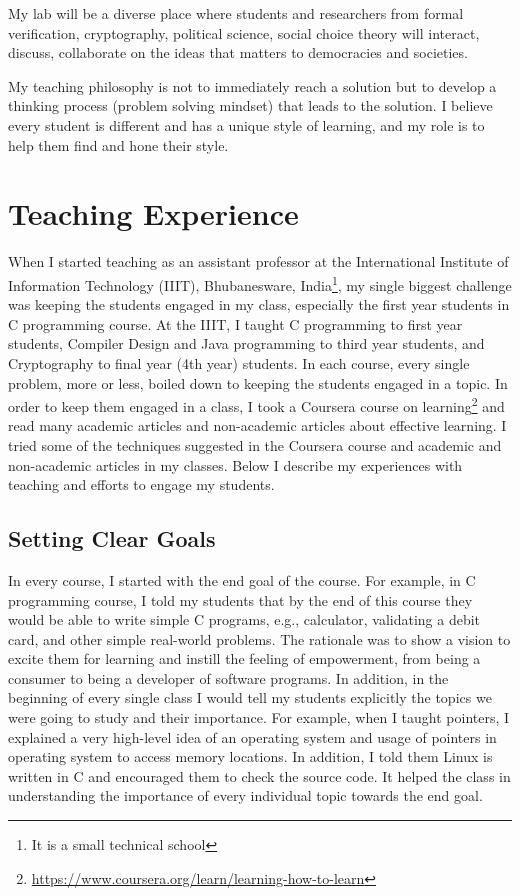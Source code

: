 \documentclass[a4paper]{article}
\begin{document}
My lab will be a diverse place where students and researchers from formal 
verification, cryptography, 
political science, social choice theory will interact, discuss, 
collaborate on the ideas that matters to democracies and societies.





\vspace{1.0cm}
My teaching philosophy is not to immediately reach a solution but to develop a 
thinking process (problem solving mindset) that leads to the solution. I believe every 
student is different and has a unique style of learning, and my role is to help them find 
and hone their style.

\section{Teaching Experience}
When I started teaching as an assistant professor at the International Institute of Information 
Technology (IIIT), Bhubanesware, India\footnote{It is a small technical school},
my single biggest challenge was keeping the students engaged in my class, especially the first year 
students in C programming course. At the IIIT, I taught C programming to 
first year students, Compiler Design and Java programming to third year students, and
Cryptography to final year (4th year) students. In each course, every single 
problem,  more or less, boiled down to keeping the students engaged in a topic. 
In order to keep them engaged in a class, I took a Coursera course on 
learning\footnote{\url{https://www.coursera.org/learn/learning-how-to-learn}} and 
read many academic articles and non-academic articles about effective learning.
I tried some of the techniques suggested in the Coursera course and 
academic and non-academic articles in my classes. Below I 
describe my experiences with teaching and efforts to engage my students. 





\subsection{Setting Clear Goals}
In every course, I started with the end goal of the course. For example, 
in C programming course, I told my students that by the end of this 
course they would be 
able to write simple C programs, e.g., calculator, 
validating a debit card, and other simple real-world problems. The rationale was 
to show a vision to excite them 
for learning and instill the feeling of empowerment, from
being a consumer to being a developer of software programs.
In addition, in the beginning of every single class 
I would tell my students explicitly the topics we were going to study and 
their importance. For example, when I taught pointers, I explained a 
very high-level idea of an operating system and usage of pointers  
in operating system to access memory locations.
In addition, I told them
Linux is written in C and encouraged them to check the source code.
It helped the class in understanding the importance of 
every individual topic towards the end goal.
\end{document}
